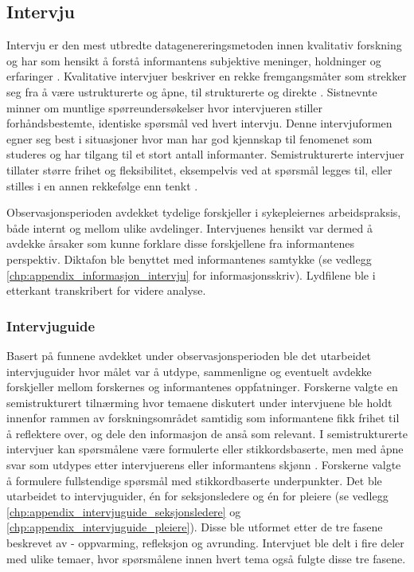 \subsection{Intervju}
\label{sec:intervju}
Intervju er den mest utbredte datagenereringsmetoden innen kvalitativ forskning og har som hensikt å forstå informantens subjektive meninger, holdninger og erfaringer \citep{Tjora}. Kvalitative intervjuer beskriver en rekke fremgangsmåter som strekker seg fra å være ustrukturerte og åpne, til strukturerte og direkte \citep{Smith12}. Sistnevnte minner om muntlige spørreundersøkelser hvor intervjueren stiller forhåndsbestemte, identiske spørsmål ved hvert intervju. Denne intervjuformen egner seg best i situasjoner hvor man har god kjennskap til fenomenet som studeres og har tilgang til et stort antall informanter. Semistrukturerte intervjuer tillater større frihet og fleksibilitet, eksempelvis ved at spørsmål legges til, eller stilles i en annen rekkefølge enn tenkt \citep{Tjora}.
 
\noindent
Observasjonsperioden avdekket tydelige forskjeller i sykepleiernes arbeidspraksis, både internt og mellom ulike avdelinger. Intervjuenes hensikt var dermed å avdekke årsaker som kunne forklare disse forskjellene fra informantenes perspektiv. Diktafon ble benyttet med informantenes samtykke (se vedlegg \ref{chp:appendix_informasjon_intervju} for informasjonsskriv). Lydfilene ble i etterkant transkribert for videre analyse.
 
\subsubsection{Intervjuguide}
Basert på funnene avdekket under observasjonsperioden ble det utarbeidet intervjuguider hvor målet var å utdype, sammenligne og eventuelt avdekke forskjeller mellom forskernes og informantenes oppfatninger. Forskerne valgte en semistrukturert tilnærming hvor temaene diskutert under intervjuene ble holdt innenfor rammen av forskningsområdet samtidig som informantene fikk frihet til å reflektere over, og dele den informasjon de anså som relevant. I semistrukturerte intervjuer kan spørsmålene være formulerte eller stikkordsbaserte, men med åpne svar som utdypes etter intervjuerens eller informantens skjønn \citep{Schensul99}. Forskerne valgte å formulere fullstendige spørsmål med stikkordbaserte underpunkter. Det ble utarbeidet to intervjuguider, én for seksjonsledere og én for pleiere (se vedlegg \ref{chp:appendix_intervjuguide_seksjonsledere} og \ref{chp:appendix_intervjuguide_pleiere}). Disse ble utformet etter de tre fasene beskrevet av \citet{Tjora} - oppvarming, refleksjon og avrunding. Intervjuet ble delt i fire deler med ulike temaer, hvor spørsmålene innen hvert tema også fulgte disse tre fasene.
 
